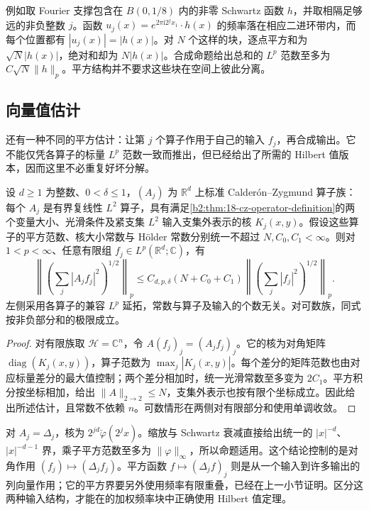 例如取 Fourier 支撑包含在 \(B(0,1/8)\) 内的非零 Schwartz 函数 \(h\)，并取相隔足够远的非负整数 \(j\)。函数 \(u_j(x)=e^{2\pi\mathrm i2^j x_1}\cdot h(x)\) 的频率落在相应二进环带内，而每个位置都有 \(|u_j(x)|=|h(x)|\)。对 \(N\) 个这样的块，逐点平方和为 \(\sqrt N|h(x)|\)，绝对和却为 \(N|h(x)|\)。合成命题给出总和的 \(L^p\) 范数至多为 \(C\sqrt N\|h\|_p\)。平方结构并不要求这些块在空间上彼此分离。

\subsection{向量值估计}
\label{b2:subsec:190403}

还有一种不同的平方估计：让第 \(j\) 个算子作用于自己的输入 \(f_j\)，再合成输出。它不能仅凭各算子的标量 \(L^p\) 范数一致而推出，但已经给出了所需的 Hilbert 值版本，因而这里不必重复好坏分解。

\begin{proposition}[统一算子族的平方估计]\label{b2:prop:19-diagonal-square}
设 \(d\geq1\) 为整数、\(0<\delta\leq1\)，\((A_j)\) 为 \(\mathbb R^d\) 上标准 Calderón--Zygmund 算子族：每个 \(A_j\) 是有界复线性 \(L^2\) 算子，具有满足\cref{b2:thm:18-cz-operator-definition}的两个变量大小、光滑条件及紧支集 \(L^2\) 输入支集外表示的核 \(K_j(x,y)\)。假设这些算子的平方范数、核大小常数与 Hölder 常数分别统一不超过 \(N,C_0,C_1<\infty\)。则对 \(1<p<\infty\)、任意有限组 \(f_j\in L^p(\mathbb R^d;\mathbb C)\)，有
\[
 \left\|\left(\sum_j|A_jf_j|^2\right)^{1/2}\right\|_p
 \leq C_{d,p,\delta}(N+C_0+C_1)
       \left\|\left(\sum_j|f_j|^2\right)^{1/2}\right\|_p.
\]
左侧采用各算子的兼容 \(L^p\) 延拓，常数与算子及输入的个数无关。对可数族，同式按非负部分和的极限成立。
\end{proposition}
\begin{proof}
对有限族取 \(\mathcal H=\mathbb C^n\)，令 \(A(f_j)_j=(A_jf_j)_j\)。它的核为对角矩阵 \(\operatorname{diag}(K_j(x,y))\)，算子范数为 \(\max_j|K_j(x,y)|\)。每个差分的矩阵范数也由对应标量差分的最大值控制；两个差分相加时，统一光滑常数至多变为 \(2C_1\)。平方积分按坐标相加，给出 \(\|A\|_{2\to2}\leq N\)，支集外表示也按有限个坐标成立。因此给出所述估计，且常数不依赖 \(n\)。可数情形在两侧对有限部分和使用单调收敛。
\end{proof}

对 \(A_j=\Delta_j\)，核为 \(2^{jd}\check\varphi(2^jx)\)。缩放与 Schwartz 衰减直接给出统一的 \(|x|^{-d}\)、\(|x|^{-d-1}\) 界，乘子平方范数至多为 \(\|\varphi\|_\infty\)，所以命题适用。这个结论控制的是对角作用 \((f_j)\mapsto(\Delta_jf_j)\)。平方函数 \(f\mapsto(\Delta_jf)_j\) 则是从一个输入到许多输出的列向量作用；它的平方界要另外使用频率有限重叠，已经在上一小节证明。区分这两种输入结构，才能在的加权频率块中正确使用 Hilbert 值定理。


